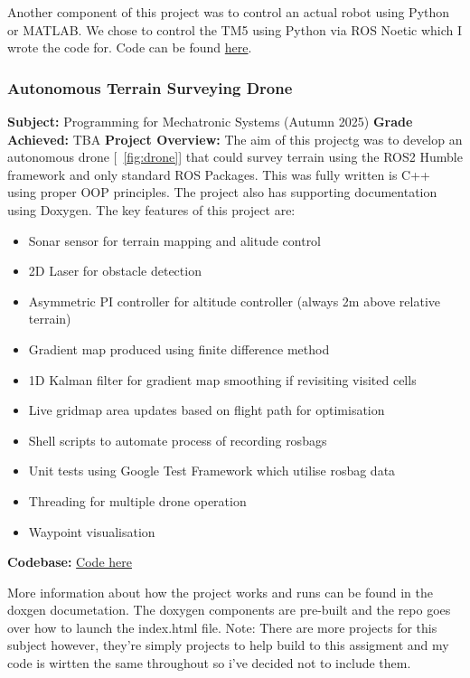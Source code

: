 Another component of this project was to control an actual robot using Python or MATLAB. We chose to control the TM5 using Python via ROS Noetic which I wrote the code for. 
Code can be found \href{https://github.com/jackfruittt/tm5_ros_python}{here}.




\newpage
\subsubsection{Autonomous Terrain Surveying Drone}
\textbf{Subject: } Programming for Mechatronic Systems (Autumn 2025) \newline
\textbf{Grade Achieved: } TBA \newline
\textbf{Project Overview: }
The aim of this projectg was to develop an autonomous drone [~\ref{fig:drone}] that could survey terrain using the ROS2 Humble framework and only standard ROS Packages. This was fully written is C++
using proper OOP principles. The project also has supporting documentation using Doxygen. The key features of this project are:

\begin{itemize}
    \item Sonar sensor for terrain mapping and alitude control
    \item 2D Laser for obstacle detection
    \item Asymmetric PI controller for altitude controller (always 2m above relative terrain)
    \item Gradient map produced using finite difference method
    \item 1D Kalman filter for gradient map smoothing if revisiting visited cells
    \item Live gridmap area updates based on flight path for optimisation
    \item Shell scripts to automate process of recording rosbags
    \item Unit tests using Google Test Framework which utilise rosbag data
    \item Threading for multiple drone operation
    \item Waypoint visualisation
\end{itemize}

\textbf{Codebase: } \href{https://github.com/jackfruittt/Terrain-Surveying-Drone}{Code here} \newline


More information about how the project works and runs can be found in the doxgen documetation. The doxygen components are pre-built and the repo goes over how to launch the index.html file.
Note: There are more projects for this subject however, they're simply projects to help build to this assigment and my code is wirtten the same throughout so i've decided not to include them.